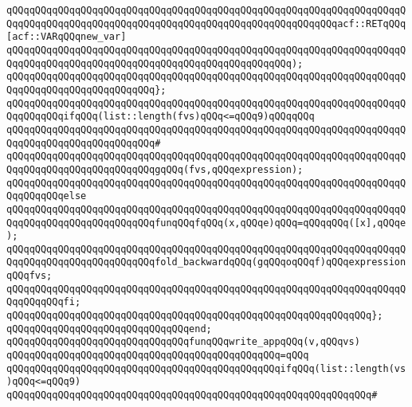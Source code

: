 \verb|qQQqqQQqqQQqqQQqqQQqqQQqqQQqqQQqqQQqqQQqqQQqqQQqqQQqqQQqqQQqqQQqqQQqqQQqqQQqqQQqqQQqqQQqqQQqqQQqqQQqqQQqqQQqqQQqqQQqqQQqqQQqqQQqacf::RETqQQq[acf::VARqQQqnew_var]|\newline
\verb|qQQqqQQqqQQqqQQqqQQqqQQqqQQqqQQqqQQqqQQqqQQqqQQqqQQqqQQqqQQqqQQqqQQqqQQqqQQqqQQqqQQqqQQqqQQqqQQqqQQqqQQqqQQqqQQqqQQqqQQq);|\newline
\verb|qQQqqQQqqQQqqQQqqQQqqQQqqQQqqQQqqQQqqQQqqQQqqQQqqQQqqQQqqQQqqQQqqQQqqQQqqQQqqQQqqQQqqQQqqQQqqQQq};|\newline
\newline
\verb|qQQqqQQqqQQqqQQqqQQqqQQqqQQqqQQqqQQqqQQqqQQqqQQqqQQqqQQqqQQqqQQqqQQqqQQqqQQqqQQqifqQQq(list::length(fvs)qQQq<=qQQq9)qQQqqQQq|\newline
\verb|qQQqqQQqqQQqqQQqqQQqqQQqqQQqqQQqqQQqqQQqqQQqqQQqqQQqqQQqqQQqqQQqqQQqqQQqqQQqqQQqqQQqqQQqqQQqqQQq#|\newline
\verb|qQQqqQQqqQQqqQQqqQQqqQQqqQQqqQQqqQQqqQQqqQQqqQQqqQQqqQQqqQQqqQQqqQQqqQQqqQQqqQQqqQQqqQQqqQQqqQQqgqQQq(fvs,qQQqexpression);|\newline
\verb|qQQqqQQqqQQqqQQqqQQqqQQqqQQqqQQqqQQqqQQqqQQqqQQqqQQqqQQqqQQqqQQqqQQqqQQqqQQqqQQqelse|\newline
\verb|qQQqqQQqqQQqqQQqqQQqqQQqqQQqqQQqqQQqqQQqqQQqqQQqqQQqqQQqqQQqqQQqqQQqqQQqqQQqqQQqqQQqqQQqqQQqqQQqfunqQQqfqQQq(x,qQQqe)qQQq=qQQqqQQq([x],qQQqe);|\newline
\newline
\verb|qQQqqQQqqQQqqQQqqQQqqQQqqQQqqQQqqQQqqQQqqQQqqQQqqQQqqQQqqQQqqQQqqQQqqQQqqQQqqQQqqQQqqQQqqQQqqQQqfold_backwardqQQq(gqQQqoqQQqf)qQQqexpressionqQQqfvs;|\newline
\verb|qQQqqQQqqQQqqQQqqQQqqQQqqQQqqQQqqQQqqQQqqQQqqQQqqQQqqQQqqQQqqQQqqQQqqQQqqQQqqQQqfi;|\newline
\verb|qQQqqQQqqQQqqQQqqQQqqQQqqQQqqQQqqQQqqQQqqQQqqQQqqQQqqQQqqQQqqQQq};|\newline
\verb|qQQqqQQqqQQqqQQqqQQqqQQqqQQqqQQqend;|\newline
\newline
\newline
\verb|qQQqqQQqqQQqqQQqqQQqqQQqqQQqqQQqfunqQQqwrite_appqQQq(v,qQQqvs)|\newline
\verb|qQQqqQQqqQQqqQQqqQQqqQQqqQQqqQQqqQQqqQQqqQQqqQQq=qQQq|\newline
\verb|qQQqqQQqqQQqqQQqqQQqqQQqqQQqqQQqqQQqqQQqqQQqqQQqifqQQq(list::length(vs)qQQq<=qQQq9)|\newline
\verb|qQQqqQQqqQQqqQQqqQQqqQQqqQQqqQQqqQQqqQQqqQQqqQQqqQQqqQQqqQQqqQQq#|\newline
